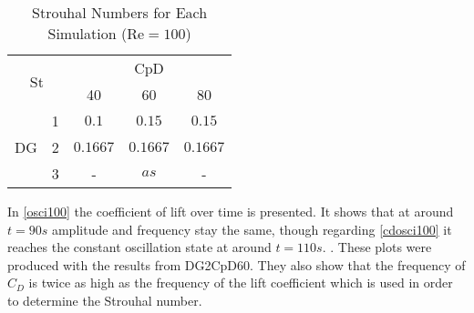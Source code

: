 \begin{table}[htp]
	\centering
	\def\arraystretch{1.5}
	\begin{tabular}{|c|c|c|c|c|}
		\hline
		\multicolumn{2}{|c|}{\multirow{2}{*}{St}} & \multicolumn{3}{c|}{CpD} \\ \cline{3-5} 
		\multicolumn{2}{|c|}{}                       & 40     & 60    & 80    \\ \hline
		\multirow{3}{*}{DG}            & 1           &    $0.1$    &    $0.15$   &    $0.15$    \\ \cline{2-5} 
		& 2           &     $0.1667$   &    $0.1667$   &     $0.1667$   \\ \cline{2-5} 
		& 3           &     -   &    $as$ \todo{sa}   &    -    \\ \hline
	\end{tabular}
	\caption{Strouhal Numbers for Each Simulation ($\text{Re} = 100$)}	
	\label{Str100}
\end{table}

In \cref{osci100} the coefficient of lift over time is presented. It shows that at around $t=90s$ amplitude and frequency stay the same, though regarding 
\cref{cdosci100} it reaches the constant oscillation state at around $t=110s$. . These plots were produced with the results from DG2CpD60. They also show that the frequency of $C_D$ is twice as high as the frequency of the lift coefficient which is used in order to determine the Strouhal number. 
	
